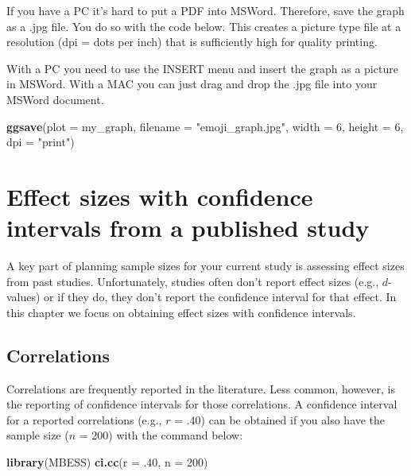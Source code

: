 \documentclass[
]{krantz}
\makeatletter
\newenvironment{Shaded}{\begin{snugshade}}{\end{snugshade}}
\newcommand{\DataTypeTok}[1]{\textcolor[rgb]{0.27,0.27,0.27}{#1}}
\newcommand{\DecValTok}[1]{\textcolor[rgb]{0.06,0.06,0.06}{#1}}
\newcommand{\FloatTok}[1]{\textcolor[rgb]{0.06,0.06,0.06}{#1}}
\newcommand{\KeywordTok}[1]{\textcolor[rgb]{0.27,0.27,0.27}{\textbf{#1}}}
\newcommand{\NormalTok}[1]{#1}
\newcommand{\StringTok}[1]{\textcolor[rgb]{0.5,0.5,0.5}{#1}}
\newenvironment{kframe}{%
\medskip{}
\setlength{\fboxsep}{.8em}
 \def\at@end@of@kframe{}%
 \ifinner\ifhmode%
  \def\at@end@of@kframe{\end{minipage}}%
  \begin{minipage}{\columnwidth}%
 \fi\fi%
 \def\FrameCommand##1{\hskip\@totalleftmargin \hskip-\fboxsep
 \colorbox{shadecolor}{##1}\hskip-\fboxsep
     \hskip-\linewidth \hskip-\@totalleftmargin \hskip\columnwidth}%
 \MakeFramed {\advance\hsize-\width
   \@totalleftmargin\z@ \linewidth\hsize
   \@setminipage}}%
 {\par\unskip\endMakeFramed%
 \at@end@of@kframe}
\renewenvironment{Shaded}{\begin{kframe}}{\end{kframe}}
\makeatother
\begin{document}
If you have a PC it's hard to put a PDF into MSWord. Therefore, save the graph as a .jpg file. You do so with the code below. This creates a picture type file at a resolution (dpi = dots per inch) that is sufficiently high for quality printing.

With a PC you need to use the INSERT menu and insert the graph as a picture in MSWord. With a MAC you can just drag and drop the .jpg file into your MSWord document.

\begin{Shaded}
\begin{Highlighting}[]
\KeywordTok{ggsave}\NormalTok{(}\DataTypeTok{plot =}\NormalTok{ my_graph, }
       \DataTypeTok{filename =} \StringTok{"emoji_graph.jpg"}\NormalTok{, }
       \DataTypeTok{width =} \DecValTok{6}\NormalTok{, }
       \DataTypeTok{height =} \DecValTok{6}\NormalTok{, }
       \DataTypeTok{dpi =} \StringTok{"print"}\NormalTok{)}
\end{Highlighting}
\end{Shaded}

\hypertarget{effect-sizes-with-confidence-intervals-from-a-published-study}{%
\chapter{Effect sizes with confidence intervals from a published study}\label{effect-sizes-with-confidence-intervals-from-a-published-study}}

A key part of planning sample sizes for your current study is assessing effect sizes from past studies. Unfortunately, studies often don't report effect sizes (e.g., \(d\)-values) or if they do, they don't report the confidence interval for that effect. In this chapter we focus on obtaining effect sizes with confidence intervals.

\hypertarget{correlations}{%
\section{Correlations}\label{correlations}}

Correlations are frequently reported in the literature. Less common, however, is the reporting of confidence intervals for those correlations. A confidence interval for a reported correlations (e.g., \(r\) = .40) can be obtained if you also have the sample size (\(n\) = 200) with the command below:

\begin{Shaded}
\begin{Highlighting}[]
\KeywordTok{library}\NormalTok{(MBESS)}
\KeywordTok{ci.cc}\NormalTok{(}\DataTypeTok{r =} \FloatTok{.40}\NormalTok{, }\DataTypeTok{n =} \DecValTok{200}\NormalTok{)}
\end{Highlighting}
\end{Shaded}
\end{document}

